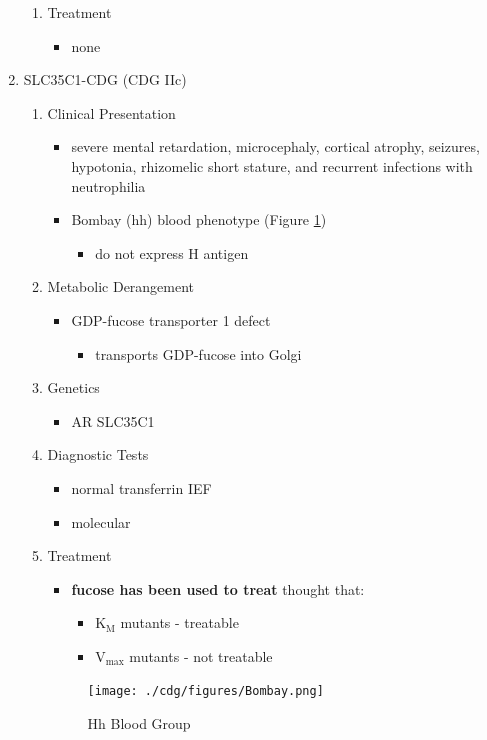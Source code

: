 \documentclass{scrartcl}
\begin{document}
\begin{enumerate}
\begin{enumerate}
\item Treatment
\label{sec:org396a68a}
\begin{itemize}
\item none
\end{itemize}
\end{enumerate}
\item SLC35C1-CDG (CDG IIc)
\label{sec:org2251c07}
\begin{enumerate}
\item Clinical Presentation
\label{sec:org9d233af}
\begin{itemize}
\item severe mental retardation, microcephaly, cortical atrophy, seizures,
hypotonia, rhizomelic short stature, and recurrent infections with
neutrophilia
\item Bombay (hh) blood phenotype (Figure \ref{fig:orgdb576be})
\begin{itemize}
\item do not express H antigen
\end{itemize}
\end{itemize}
\item Metabolic Derangement
\label{sec:org207b32e}
\begin{itemize}
\item GDP-fucose transporter 1 defect
\begin{itemize}
\item transports GDP-fucose into Golgi
\end{itemize}
\end{itemize}
\item Genetics
\label{sec:orgd079e43}
\begin{itemize}
\item AR SLC35C1
\end{itemize}

\item Diagnostic Tests
\label{sec:org8418876}
\begin{itemize}
\item normal transferrin IEF
\item molecular
\end{itemize}
\item Treatment
\label{sec:org5d15099}
\begin{itemize}
\item \textbf{fucose has been used to treat} thought that:
\begin{itemize}
\item K\(_{\text{M}}\) mutants - treatable
\item V\(_{\text{max}}\) mutants - not treatable
\end{itemize}
\end{itemize}

\begin{figure}[htbp]
\centering
\texttt{[image: ./cdg/figures/Bombay.png]}
\caption[Hh]{\label{fig:orgdb576be}
Hh Blood Group}
\end{figure}
\end{enumerate}
\end{enumerate}
\end{document}
